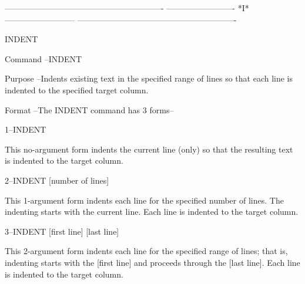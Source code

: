  
 
 
 
 
 
 
 
 
 
 
 
 
 
 
 
 
 
 
 
 
 
 
 
 
 
 
 
 
 
 
 
 
 
 
 
 
 
 
 
 
 
 
 
 
 
 
 
 
 
 
 
 
 
 
 
 
----------------------------------------------------------
-------------------------  *I*  --------------------------
----------------------------------------------------------
 
INDENT
 
Command --INDENT
 
Purpose --Indents existing text in the specified range
          of lines so that each line is indented to
          the specified target column.
 
Format  --The INDENT command has 3 forms--
 
       1--INDENT
 
          This no-argument form indents the current
          line (only) so that the resulting text
          is indented to the target column.
 
       2--INDENT     [number of lines]
 
          This 1-argument form indents each line
          for the specified number of lines.  The
          indenting starts with the current line.
          Each line is indented to the target column.
 
       3--INDENT   [first line]   [last line]
 
          This 2-argument form indents each line
          for the specified range of lines; that is,
          indenting starts with the   [first line]
          and proceeds through the   [last line].
          Each line is indented to the target column.
 
